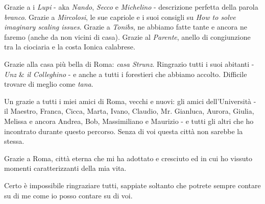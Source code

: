 \begin{acknowledgements}
    Grazie a i \textit{Lupi}\textsuperscript{\texttrademark} - aka \textit{Nando}, \textit{Secco} e \textit{Michelino} - descrizione perfetta della parola \textit{branco}. Grazie a \textit{Mircolosi}, le sue capriole e i suoi consigli su \textit{How to solve imaginary scaling issues}. Grazie a \textit{Tonibs}, ne abbiamo fatte tante e ancora ne faremo (anche da non vicini di casa). Grazie al \textit{Parente}, anello di congiunzione tra la ciociaria e la costa Ionica calabrese.
    
    Grazie alla casa più bella di Roma: \textit{casa Strunz}. Ringrazio tutti i suoi abitanti - \textit{Unz} \& \textit{il Colleghino} - e anche a tutti i forestieri che abbiamo accolto. Difficile trovare di meglio come \textit{tana}.
    
    Un grazie a tutti i miei amici di Roma, vecchi e nuovi: gli amici dell'Università - il Maestro, Franca, Cicca, Marta, Ivano, Claudio, Mr. Gianluca, Aurora, Giulia, Melissa e ancora Andrea, Bob, Massimiliano e Maurizio - e tutti gli altri che ho incontrato durante questo percorso. Senza di voi questa città non sarebbe la stessa.
    
    Grazie a Roma, città eterna che mi ha adottato e cresciuto ed in cui ho vissuto momenti caratterizzanti della mia vita.
    
    Certo è impossibile ringraziare tutti, sappiate soltanto che potrete sempre contare su di me come io posso contare su di voi. 
\end{acknowledgements}